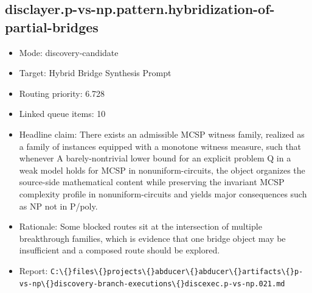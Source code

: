 \documentclass[11pt]{article}
\begin{document}
\subsection*{disclayer.p-vs-np.pattern.hybridization-of-partial-bridges}
\begin{itemize}
\item Mode: discovery-candidate
\item Target: Hybrid Bridge Synthesis Prompt
\item Routing priority: 6.728
\item Linked queue items: 10
\item Headline claim: There exists an admissible MCSP witness family, realized as a family of instances equipped with a monotone witness measure, such that whenever A barely-nontrivial lower bound for an explicit problem Q in a weak model holds for MCSP in nonuniform-circuits, the object organizes the source-side mathematical content while preserving the invariant MCSP complexity profile in nonuniform-circuits and yields major consequences such as NP not in P/poly.
\item Rationale: Some blocked routes sit at the intersection of multiple breakthrough families, which is evidence that one bridge object may be insufficient and a composed route should be explored.
\item Report: \texttt{C:\textbackslash\{\}files\textbackslash\{\}projects\textbackslash\{\}abducer\textbackslash\{\}abducer\textbackslash\{\}artifacts\textbackslash\{\}p-vs-np\textbackslash\{\}discovery-branch-executions\textbackslash\{\}discexec.p-vs-np.021.md}
\end{itemize}
\end{document}
